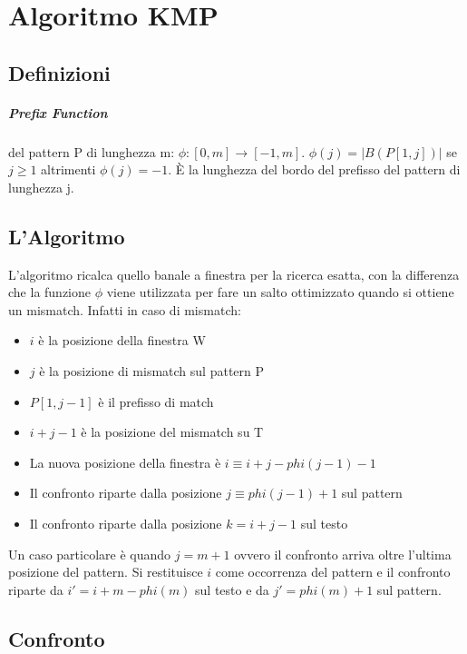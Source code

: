 \chapter{Algoritmo KMP}

\section{Definizioni}

\paragraph{Prefix Function} del pattern P di lunghezza m: $\phi : [0,m] \rightarrow [-1,m]$. $\phi(j) = |B(P[1,j])|$ se $j \geq 1$ altrimenti $\phi(j) = -1$. \`E la lunghezza del bordo del prefisso del pattern di lunghezza j.

\section{L'Algoritmo}

L'algoritmo ricalca quello banale a finestra per la ricerca esatta, con la differenza che la funzione $\phi$ viene utilizzata per fare un salto ottimizzato quando si ottiene un mismatch. Infatti in caso di mismatch:

\begin{itemize}
    \item $i$ \`e la posizione della finestra W
    \item $j$ \`e la posizione di mismatch sul pattern P
    \item $P[1,j-1]$ \`e il prefisso di match
    \item $i+j-1$ \`e la posizione del mismatch su T
    \item La nuova posizione della finestra \`e $i \equiv i + j - phi(j-1) - 1$
    \item Il confronto riparte dalla posizione $j \equiv phi(j-1) + 1$ sul pattern
    \item Il confronto riparte dalla posizione $k = i + j - 1$ sul testo
\end{itemize}

Un caso particolare \`e quando $j = m+1$ ovvero il confronto arriva oltre l'ultima posizione del pattern. Si restituisce $i$ come occorrenza del pattern e il confronto riparte da $i' = i + m - phi(m)$ sul testo e da $j' = phi(m) + 1$ sul pattern.

\section{Confronto}

